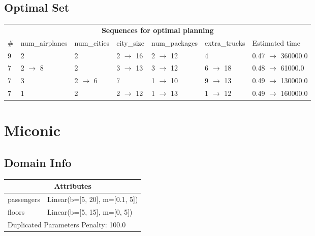 \documentclass{article}
\begin{document}
                            \subsection*{Optimal Set}

                            \begin{center}
                            \begin{tabular}{l|l|l|l|l|l|l}
                            \multicolumn{7}{c}{\bf \large Sequences for optimal planning}\\
                            \# & num\_airplanes & num\_cities & city\_size & num\_packages & extra\_trucks & Estimated time\\\midrule
                            9&2&2&2 $\rightarrow$ 16&2 $\rightarrow$ 12&4&0.47 $\rightarrow$ 360000.0\\
7&2 $\rightarrow$ 8&2&3 $\rightarrow$ 13&3 $\rightarrow$ 12&6 $\rightarrow$ 18&0.48 $\rightarrow$ 61000.0\\
7&3&2 $\rightarrow$ 6&7&1 $\rightarrow$ 10&9 $\rightarrow$ 13&0.49 $\rightarrow$ 130000.0\\
7&1&2&2 $\rightarrow$ 12&1 $\rightarrow$ 13&1 $\rightarrow$ 12&0.49 $\rightarrow$ 160000.0
                            \end{tabular}
                            \end{center}
                    \newpage \section{Miconic}
                    \subsection*{Domain Info}

                    \begin{center}
                    \begin{tabular}{p{}p{}}
                    \multicolumn{2}{c}{\bf \large Attributes}\\\midrule
                    passengers & Linear(b=[5, 20], m=[0.1, 5])\\
floors & Linear(b=[5, 15], m=[0, 5])
                    
                     \\\midrule
                    \multicolumn{2}{l}{Duplicated Parameters Penalty: 100.0}
                    \end{tabular}
                    \end{center}
                
\end{document}
